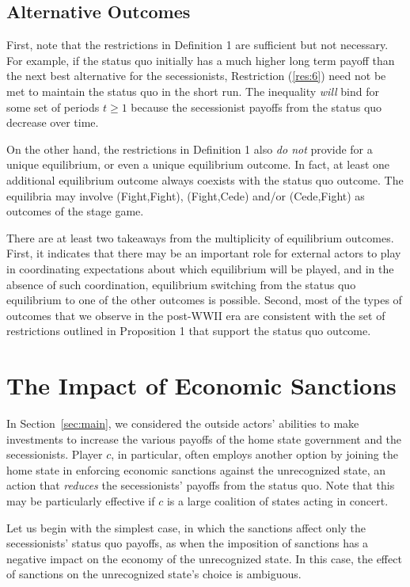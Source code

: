 \subsection{Alternative Outcomes}
\label{sec:alt}

First, note that the restrictions in Definition 1 are sufficient but not necessary. For example, if the status quo initially has a much higher long term payoff than the next best alternative for the secessionists, Restriction (\ref{res:6}) need not be met to maintain the status quo in the short run. The inequality \emph{will} bind for some set of periods $t \geq 1$ because the secessionist payoffs from the status quo decrease over time. 

On the other hand, the restrictions in Definition 1 also \emph{do not} provide for a unique equilibrium, or even a unique equilibrium outcome. In fact, at least one additional equilibrium outcome always coexists with the status quo outcome. The equilibria may involve (Fight,Fight), (Fight,Cede) and/or (Cede,Fight) as outcomes of the stage game.

There are at least two takeaways from the multiplicity of equilibrium outcomes. First, it indicates that there may be an important role for external actors to play in coordinating expectations about which equilibrium will be played, and in the absence of such coordination, equilibrium switching from the status quo equilibrium to one of the other outcomes is possible. Second, most of the types of outcomes that we observe in the post-WWII era are consistent with the set of restrictions outlined in Proposition 1 that support the status quo outcome. 

\section{The Impact of Economic Sanctions}
\label{sec:sanctions}

In Section~\ref{sec:main}, we considered the outside actors' abilities to make investments to increase the various payoffs of the home state government and the secessionists. Player $c$, in particular, often employs another option by joining the home state in enforcing economic sanctions against the unrecognized state, an action that \emph{reduces} the secessionists' payoffs from the status quo. Note that this may be particularly effective if $c$ is a large coalition of states acting in concert. 

Let us begin with the simplest case, in which the sanctions affect only the secessionists' status quo payoffs, as when the imposition of sanctions has a negative impact on the economy of the unrecognized state. In this case, the effect of sanctions on the unrecognized state's choice is ambiguous. 

